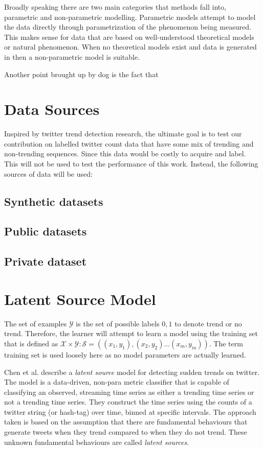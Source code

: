 Broadly speaking there are two main categories that methods fall into, parametric and non-parametric modelling. Parametric models attempt to model the data directly through parametrization of the phenomenon being measured. This makes sense for data that are based on well-understood theoretical models or natural phenomenon. When no theoretical models exist and data is generated in then a non-parametric model is suitable.

Another point brought up by dog \cite{aminikhanghahi2017survey} is the fact that

\section{Data Sources}

Inspired by twitter trend detection research, the ultimate goal is to test our contribution on labelled twitter count data that have some mix of trending and non-trending sequences. Since this data would be costly to acquire and label. This will not be used to test the performance of this work. Instead, the following sources of data will be used:
 \subsection{Synthetic datasets}
 \subsection{Public datasets}
\subsection{Private dataset}
  
\section{Latent Source Model}
The set of examples
$\mathcal{Y}$ is the set of possible labels ${0,1}$ to denote trend or no trend. Therefore, the learner will attempt to learn a model using the training set that is defined as $\mathcal{X} \times \mathcal{Y} : \mathcal{S} = ((x_1,y_1), (x_2,y_2)...(x_m,y_m))$. The term training set is used loosely here as no model parameters are actually learned.

Chen et al.  \cite{NIPS2013_5116} describe a \textit{latent source} model for detecting sudden trends on twitter. The model is a data-driven, non-para metric classifier that is capable of classifying an observed, streaming time series as either a trending time series or not a trending time series. They construct the time series using the counts of a twitter string (or hash-tag) over time, binned at specific intervals. The approach taken is based on the assumption that there are fundamental behaviours that generate tweets when they trend compared to when they do not trend. These unknown fundamental behaviours are called \textit{latent sources}.  

